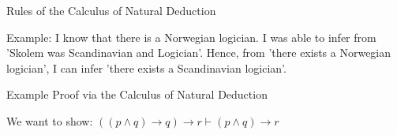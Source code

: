 \documentclass{beamer}
\begin{document}
  \begin{frame}{Rules of the Calculus of Natural Deduction}


      \begin{prooftree}
    \end{prooftree}

    \begin{prooftree}
    \end{prooftree}


    \vspace{0.5cm}
    Example: I know that there is a Norwegian logician. I was able to infer from 'Skolem was Scandinavian and Logician'. Hence, from 'there exists a Norwegian logician', I can infer 'there exists a Scandinavian logician'.

  \end{frame}

\begin{frame}{Example Proof via the Calculus of Natural Deduction}

  
  We want to show: $((p\wedge q)\rightarrow q)\rightarrow r\vdash (p\wedge q)\rightarrow r$

  \begin{prooftree}
    
  \end{prooftree}
\end{frame}





  
  
\end{document}
